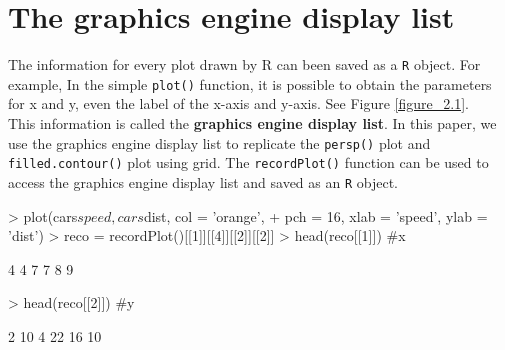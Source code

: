 \documentclass[11pt,twoside]{report}
\begin{document}
\chapter{The graphics engine display list}
The information for every plot drawn by R can been saved as a \texttt{R} object. For example, In the simple \texttt{plot()} function, it is possible to obtain the parameters for x and y, even the label of the x-axis and y-axis. See Figure \ref{figure_2.1}.\\

This information is called the \textbf{graphics engine display list}. In this paper, we use the graphics engine display list to replicate the \texttt{persp()} plot and \texttt{filled.contour()} plot using grid. The \texttt{recordPlot()} function can be used to access the graphics engine display list and saved as an \texttt{R} object.

\begin{Schunk}
\begin{Sinput}
> plot(cars$speed, cars$dist, col = 'orange', 
+       pch = 16, xlab = 'speed', ylab = 'dist')
> reco = recordPlot()[[1]][[4]][[2]][[2]]
> head(reco[[1]]) #x
\end{Sinput}
\begin{Soutput}
[1] 4 4 7 7 8 9
\end{Soutput}
\begin{Sinput}
> head(reco[[2]]) #y
\end{Sinput}
\begin{Soutput}
[1]  2 10  4 22 16 10
\end{Soutput}
\end{Schunk}
\end{document}
